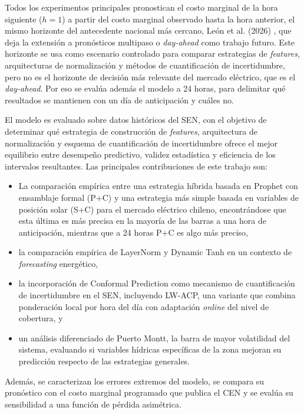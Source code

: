Todos los experimentos principales pronostican el costo marginal de la hora siguiente ($h=1$) a partir del costo marginal observado hasta la hora anterior, el mismo horizonte del antecedente nacional más cercano, León et al. (2026) \cite{LeonSMPChile}, que deja la extensión a pronósticos multipaso o \textit{day-ahead} como trabajo futuro. Este horizonte se usa como escenario controlado para comparar estrategias de \textit{features}, arquitecturas de normalización y métodos de cuantificación de incertidumbre, pero no es el horizonte de decisión más relevante del mercado eléctrico, que es el \textit{day-ahead}. Por eso se evalúa además el modelo a 24 horas, para delimitar qué resultados se mantienen con un día de anticipación y cuáles no.

El modelo es evaluado sobre datos históricos del SEN, con el objetivo de determinar qué estrategia de construcción de \textit{features}, arquitectura de normalización y esquema de cuantificación de incertidumbre ofrece el mejor equilibrio entre desempeño predictivo, validez estadística y eficiencia de los intervalos resultantes. Las principales contribuciones de este trabajo son:
\begin{itemize}
    \item[(i)] La comparación empírica entre una estrategia híbrida basada en Prophet con ensamblaje formal (P+C) y una estrategia más simple basada en variables de posición solar (S+C) para el mercado eléctrico chileno, encontrándose que esta última es más precisa en la mayoría de las barras a una hora de anticipación, mientras que a 24 horas P+C es algo más preciso,

    \item[(ii)] la comparación empírica de LayerNorm y Dynamic Tanh en un contexto de \textit{forecasting} energético,

    \item[(iii)] la incorporación de Conformal Prediction como mecanismo de cuantificación de incertidumbre en el SEN, incluyendo LW-ACP, una variante que combina ponderación local por hora del día con adaptación \textit{online} del nivel de cobertura, y

    \item[(iv)] un análisis diferenciado de Puerto Montt, la barra de mayor volatilidad del sistema, evaluando si variables hídricas específicas de la zona mejoran su predicción respecto de las estrategias generales.
\end{itemize}

Además, se caracterizan los errores extremos del modelo, se compara su pronóstico con el costo marginal programado que publica el CEN y se evalúa su sensibilidad a una función de pérdida asimétrica.
 
